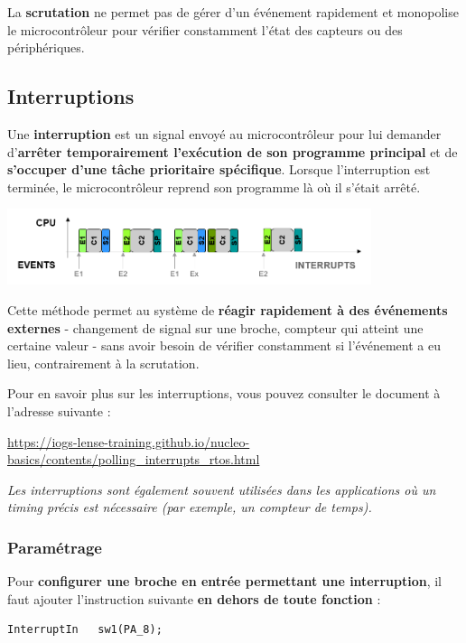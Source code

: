 \documentclass[a4paper,11pt,titlepage]{article} %
\begin{document}
La \textbf{scrutation} ne permet pas de gérer d'un événement rapidement et monopolise le microcontrôleur pour vérifier constamment l'état des capteurs ou des périphériques.


\subsection{Interruptions}

Une \textbf{interruption} est un signal envoyé au microcontrôleur pour lui demander d'\textbf{arrêter temporairement l'exécution de son programme principal} et de \textbf{s'occuper d'une tâche prioritaire spécifique}. Lorsque l'interruption est terminée, le microcontrôleur reprend son programme là où il s'était arrêté.

\begin{center}
	\includegraphics[width=0.8\textwidth]{images/gen_isr.png}
\end{center}


Cette méthode permet au système de \textbf{réagir rapidement à des événements externes} - changement de signal sur une broche, compteur qui atteint une certaine valeur - sans avoir besoin de vérifier constamment si l'événement a eu lieu, contrairement à la scrutation. 

Pour en savoir plus sur les interruptions, vous pouvez consulter le document à l'adresse suivante :

\href{https://iogs-lense-training.github.io/nucleo-basics/contents/polling_interrupts_rtos.html}{https://iogs-lense-training.github.io/nucleo-basics/contents/polling\_interrupts\_rtos.html}

\textit{Les interruptions sont également souvent utilisées dans les applications où un timing précis est nécessaire (par exemple, un compteur de temps).}


\subsubsection{Paramétrage}

Pour \textbf{configurer une broche en entrée permettant une interruption}, il faut ajouter l'instruction suivante \textbf{en dehors de toute fonction} :

\begin{lstlisting}
InterruptIn   sw1(PA_8);
\end{lstlisting}
\end{document}
